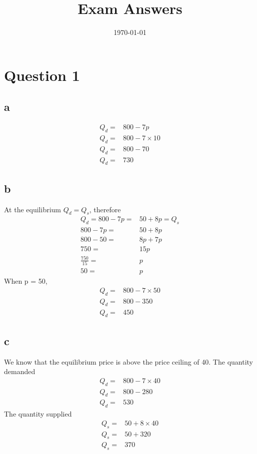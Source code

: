 \documentclass[12pt, a4paper, oneside]{article}\usepackage{graphicx, color}
\begin{document}
\title{Exam Answers}
\date{\today}
\maketitle
\section*{Question 1}
\subsection*{a}
\begin{align*}
Q_d =& 800 - 7p\\
Q_d =& 800 - 7 \times 10\\
Q_d =& 800 - 70\\
Q_d =& 730
\end{align*}

\subsection*{b}
At the equilibrium $Q_d = Q_s$, therefore
\begin{align*}
Q_d = 800 - 7p =& 50 +8p = Q_s\\
800 - 7p =& 50 + 8p\\
800 -50 =& 8p + 7p\\
750 =& 15p\\
\frac{750}{15} =& p\\
50 =& p
\end{align*}
When p = 50, 
\begin{align*}
Q_d =& 800 - 7 \times 50\\
Q_d =& 800 - 350\\
Q_d =& 450
\end{align*}

\subsection*{c}
We know that the equilibrium price is above the price ceiling of 40.
The quantity demanded
\begin{align*}
Q_d =& 800 - 7 \times 40\\
Q_d =& 800 - 280\\
Q_d =& 530
\end{align*}
The quantity supplied
\begin{align*}
Q_s =& 50 + 8 \times 40\\
Q_s =& 50 + 320\\
Q_s =& 370
\end{align*}
\end{document}
